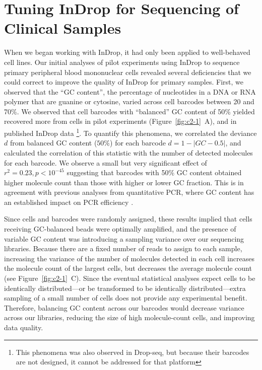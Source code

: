 \section{Tuning InDrop for Sequencing of Clinical Samples}

When we began working with InDrop, it had only been applied to well-behaved cell lines. 
Our initial analyses of pilot experiments using InDrop to sequence primary peripheral blood mononuclear cells revealed several deficiencies that we could correct to improve the quality of InDrop for primary samples.
First, we observed that the ``GC content'', the percentage of nucleotides in a DNA or RNA polymer that are guanine or cytosine, varied across cell barcodes between 20 and 70\%. 
We observed that cell barcodes with ``balanced'' GC content of 50\% yielded recovered more from cells in pilot experiments (Figure~\ref{fig:c2-1}~A), and in published InDrop data \citep{Klein2015}\footnote{This phenomena was also observed in Drop-seq, but because their barcodes are not designed, it cannot be addressed for that platform}.
To quantify this phenomena, we correlated the deviance $d$ from balanced GC content ($50\%$) for each barcode $d = 1 - |GC - 0.5|$, and calculated the correlation of this statistic with the number of detected molecules for each barcode. 
We observe a small but very significant effect of $r^{2} = 0.23, p < 10^{-45}$ suggesting that barcodes with 50\% GC content obtained higher molecule count than those with higher or lower GC fraction.
This is in agreement with previous analyses from quantitative PCR, where GC content has an established impact on PCR efficiency \citep{Mamedov2008}. 

Since cells and barcodes were randomly assigned, these results implied that cells receiving GC-balanced beads were optimally amplified, and the presence of variable GC content was introducing a sampling variance over our sequencing libraries.
Because there are a fixed number of reads to assign to each sample, increasing the variance of the number of molecules detected in each cell increases the molecule count of the largest cells, but decreases the average molecule count (see Figure~\ref{fig:c2-1}~C).
Since the eventual statistical analyses expect cells to be identically distributed---or be transformed to be identically distributed---extra sampling of a small number of cells does not provide any experimental benefit. 
Therefore, balancing GC content across our barcodes would decrease variance across our libraries, reducing the size of high molecule-count cells, and improving data quality. 

